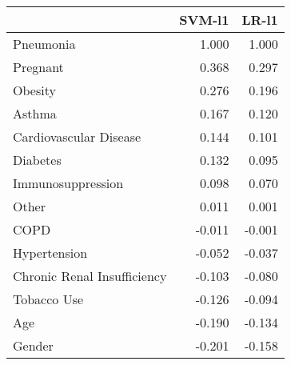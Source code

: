 \begin{tabular}{lrr}
\toprule
{} &  SVM-l1 &  LR-l1 \\
\midrule
Pneumonia                   &   1.000 &  1.000 \\
Pregnant                    &   0.368 &  0.297 \\
Obesity                     &   0.276 &  0.196 \\
Asthma                      &   0.167 &  0.120 \\
Cardiovascular Disease      &   0.144 &  0.101 \\
Diabetes                    &   0.132 &  0.095 \\
Immunosuppression           &   0.098 &  0.070 \\
Other                       &   0.011 &  0.001 \\
COPD                        &  -0.011 & -0.001 \\
Hypertension                &  -0.052 & -0.037 \\
Chronic Renal Insufficiency &  -0.103 & -0.080 \\
Tobacco Use                 &  -0.126 & -0.094 \\
Age                         &  -0.190 & -0.134 \\
Gender                      &  -0.201 & -0.158 \\
\bottomrule
\end{tabular}
